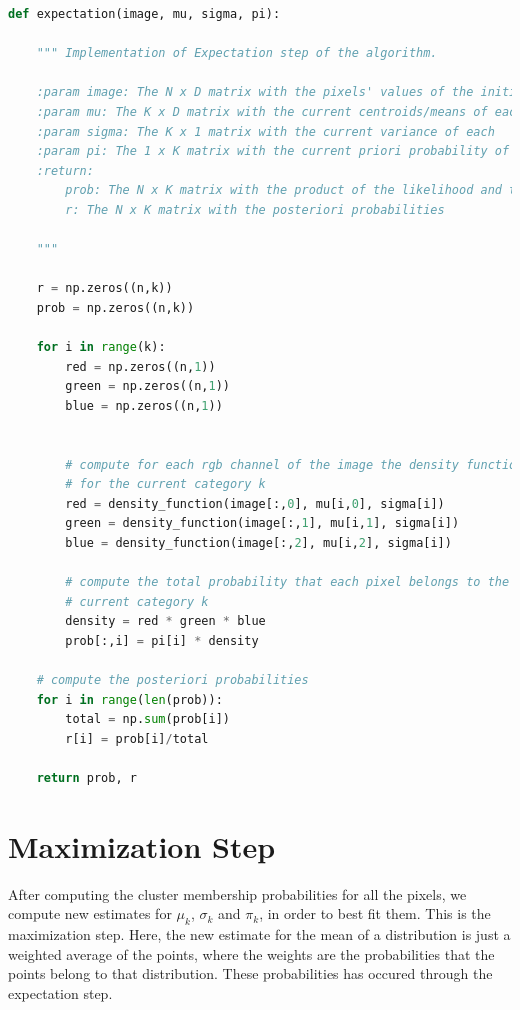 \documentclass[11pt]{article}
\begin{document}
\begin{lstlisting}[language = Python]
def expectation(image, mu, sigma, pi): 
    
    """ Implementation of Expectation step of the algorithm.
    
    :param image: The N x D matrix with the pixels' values of the initial            image
    :param mu: The K x D matrix with the current centroids/means of each             cluster
    :param sigma: The K x 1 matrix with the current variance of each                 cluster
    :param pi: The 1 x K matrix with the current priori probability of each          cluster
    :return:
        prob: The N x K matrix with the product of the likelihood and the            priori probability of each pixel and cluster
        r: The N x K matrix with the posteriori probabilities
        
    """
    
    r = np.zeros((n,k))
    prob = np.zeros((n,k))
    
    for i in range(k):
        red = np.zeros((n,1))
        green = np.zeros((n,1))
        blue = np.zeros((n,1))
        
        
        # compute for each rgb channel of the image the density function
        # for the current category k
        red = density_function(image[:,0], mu[i,0], sigma[i])
        green = density_function(image[:,1], mu[i,1], sigma[i])
        blue = density_function(image[:,2], mu[i,2], sigma[i])
        
        # compute the total probability that each pixel belongs to the 
        # current category k
        density = red * green * blue
        prob[:,i] = pi[i] * density  
    
    # compute the posteriori probabilities
    for i in range(len(prob)):
        total = np.sum(prob[i])
        r[i] = prob[i]/total

    return prob, r
    \end{lstlisting}
    
\section{Maximization Step}
After computing the cluster membership probabilities for all the pixels, we compute new estimates for $\mu_{k}$, $\sigma_k$ and $\pi_k$, in order to best fit them. This is the maximization step. Here, the new estimate for the mean of a distribution is just a weighted average of the points, where the weights are the probabilities that the points belong to that distribution. These probabilities has occured through the expectation step. \\
\end{document}
